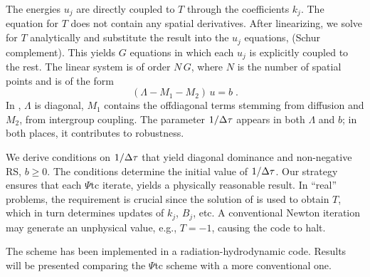 \documentclass{report}
\begin{document}
The energies $u_j$ are directly coupled to $T$
through the coefficients $k_j$.
The equation for $T$ does not contain any spatial derivatives.
After linearizing, we solve for $T$ analytically and
substitute the result into the $u_j$ equations,
(Schur complement). This yields $G$
equations in which each $u_j$ is explicitly
coupled to the rest. The linear system is of
order $N \, G$, where $N$ is the number of spatial
points and is of the form
\begin{equation}
(\Lambda - M_1 - M_2) \, u = b \; . \label{linsys}
\end{equation}
In ,
$\Lambda$ is diagonal, $M_1$ contains the offdiagonal terms
stemming from diffusion and $M_2$, from
intergroup coupling. The parameter $1/\Delta \tau$
appears in both $\Lambda$ and $b$; in both places, it contributes
to robustness.

We derive conditions on $1/\Delta \tau$ that yield
diagonal dominance and non-negative RS, $b \ge 0$.
The conditions determine the initial value of $1/\Delta \tau$.
Our strategy ensures that each $\Psi$tc iterate,
yields a physically reasonable result.
In ``real'' problems, the requirement is crucial since the
solution of  is used to obtain $T$, which
in turn determines updates of $k_j$, $B_j$, etc.
A conventional Newton iteration may generate an unphysical
value, e.g., $T = -1$, causing the code to halt.

The scheme has been implemented in a radiation-hydrodynamic
code. Results will be presented comparing
the $\Psi$tc scheme with a more conventional one.
\end{document}
